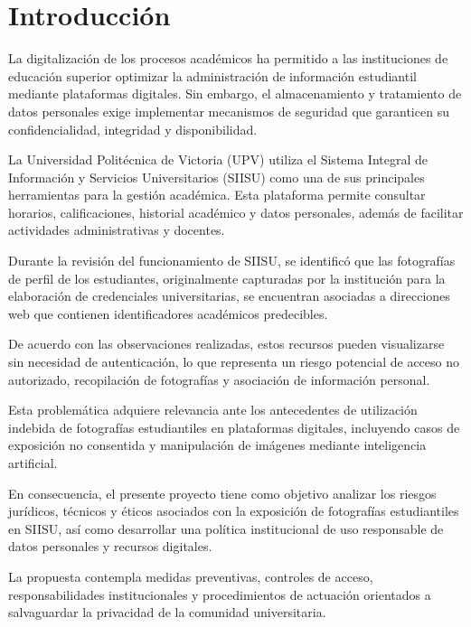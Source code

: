 \documentclass[12pt]{article}
\begin{document}
\tableofcontents
\clearpage

\setcounter{page}{1}

\section{Introducción}

La digitalización de los procesos académicos ha permitido
a las instituciones de educación superior optimizar la
administración de información estudiantil mediante
plataformas digitales. Sin embargo, el almacenamiento
y tratamiento de datos personales exige implementar
mecanismos de seguridad que garanticen su confidencialidad,
integridad y disponibilidad.

La Universidad Politécnica de Victoria (UPV) utiliza
el Sistema Integral de Información y Servicios
Universitarios (SIISU) como una de sus principales
herramientas para la gestión académica. Esta plataforma
permite consultar horarios, calificaciones, historial
académico y datos personales, además de facilitar
actividades administrativas y docentes.

Durante la revisión del funcionamiento de SIISU,
se identificó que las fotografías de perfil de los
estudiantes, originalmente capturadas por la institución
para la elaboración de credenciales universitarias,
se encuentran asociadas a direcciones web que
contienen identificadores académicos predecibles.

De acuerdo con las observaciones realizadas, estos
recursos pueden visualizarse sin necesidad de
autenticación, lo que representa un riesgo potencial
de acceso no autorizado, recopilación de fotografías
y asociación de información personal.

Esta problemática adquiere relevancia ante los
antecedentes de utilización indebida de fotografías
estudiantiles en plataformas digitales, incluyendo
casos de exposición no consentida y manipulación
de imágenes mediante inteligencia artificial.

En consecuencia, el presente proyecto tiene como
objetivo analizar los riesgos jurídicos, técnicos y
éticos asociados con la exposición de fotografías
estudiantiles en SIISU, así como desarrollar una
política institucional de uso responsable de datos
personales y recursos digitales.

La propuesta contempla medidas preventivas,
controles de acceso, responsabilidades institucionales
y procedimientos de actuación orientados a
salvaguardar la privacidad de la comunidad
universitaria.
\end{document}
